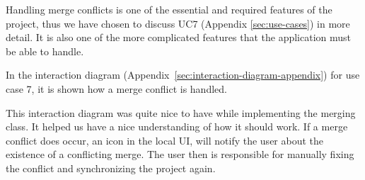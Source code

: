 Handling merge conflicts is one of the essential and required features of the project, thus we have chosen to discuss UC7 (Appendix \ref{sec:use-cases})
in more detail. It is also one of the more complicated features that the application must be able to handle.

In the interaction diagram (Appendix~\ref{sec:interaction-diagram-appendix}) for use case 7, it is shown how a merge conflict is handled. 

This interaction diagram was quite nice to have while implementing the merging class. It helped us have a nice understanding of how it should work. If
a merge conflict does occur, an icon in the local UI, will notify the user about the existence of a conflicting merge. The user then is responsible for manually 
fixing the conflict and synchronizing the project again.

